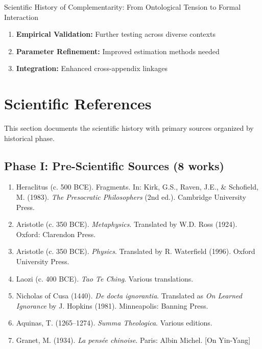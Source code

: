 \begin{chapter}{Scientific History of Complementarity: From Ontological Tension to Formal Interaction}
\begin{enumerate}
    \item \textbf{Empirical Validation:} Further testing across diverse contexts
    \item \textbf{Parameter Refinement:} Improved estimation methods needed
    \item \textbf{Integration:} Enhanced cross-appendix linkages
\end{enumerate}

\section{Scientific References}

\nocite{bcm_master}

\label{sec:references}

This section documents the scientific history with primary sources organized by historical phase.

\subsection{Phase I: Pre-Scientific Sources (8 works)}

\begin{enumerate}
    \item Heraclitus (c. 500 BCE). Fragments. In: Kirk, G.S., Raven, J.E., \& Schofield, M. (1983). \textit{The Presocratic Philosophers} (2nd ed.). Cambridge University Press.

    \item Aristotle (c. 350 BCE). \textit{Metaphysics}. Translated by W.D. Ross (1924). Oxford: Clarendon Press.

    \item Aristotle (c. 350 BCE). \textit{Physics}. Translated by R. Waterfield (1996). Oxford University Press.

    \item Laozi (c. 400 BCE). \textit{Tao Te Ching}. Various translations.

    \item Nicholas of Cusa (1440). \textit{De docta ignorantia}. Translated as \textit{On Learned Ignorance} by J. Hopkins (1981). Minneapolis: Banning Press.

    \item Aquinas, T. (1265--1274). \textit{Summa Theologica}. Various editions.

    \item Granet, M. (1934). \textit{La pensée chinoise}. Paris: Albin Michel. [On Yin-Yang]


\end{enumerate}
\end{chapter}
